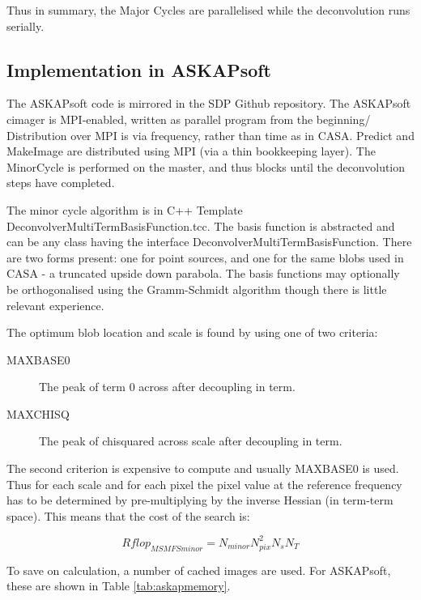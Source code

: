 \documentclass[11pt,a4paper,variablewidth]{article}
\begin{document}
Thus in summary, the Major Cycles are parallelised while the deconvolution runs serially.

\subsection{Implementation in ASKAPsoft}

The ASKAPsoft code is mirrored in the SDP Github repository. The ASKAPsoft cimager is MPI-enabled, written as parallel program from the beginning/ Distribution over MPI is via frequency, rather than time as in CASA. Predict and MakeImage are distributed using MPI (via a thin bookkeeping layer). The MinorCycle is performed on the master, and thus blocks until the deconvolution steps have completed.

The minor cycle  algorithm is in C++ Template DeconvolverMultiTermBasisFunction.tcc. The basis function is abstracted and can be any class having the interface DeconvolverMultiTermBasisFunction. There are two forms present: one for point sources, and one for the same blobs used in CASA - a truncated upside down parabola. The basis functions may optionally be orthogonalised using the Gramm-Schmidt algorithm though there is little relevant experience.

The optimum blob location and scale is found by using one of two criteria:

\begin{description}
\item[MAXBASE0] The peak of term 0 across after decoupling in term.
\item[MAXCHISQ] The peak of chisquared across scale after decoupling in term.
\end{description}

The second criterion is expensive to compute and usually MAXBASE0 is used. Thus for each scale and for each pixel the pixel value at the reference frequency has to be determined by pre-multiplying by the inverse Hessian (in term-term space). This means that the cost of the search is:

\begin{equation}
Rflop_{MSMFSminor} = N_{minor} N_{pix}^2 N_s N_T	
\end{equation}


To save on calculation, a number of cached images are used. For ASKAPsoft, these are shown in Table \ref{tab:askapmemory}.
\end{document}
